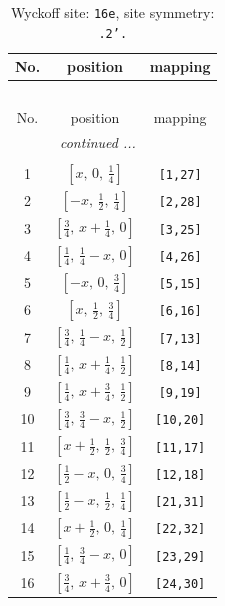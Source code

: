\documentclass[fleqn,8pt]{jsarticle}
\begin{document}
\renewcommand{\arraystretch}{1.2}
\begin{longtable}{ccc}
\caption{Wyckoff site: {\tt 16e}, site symmetry: {\tt .2'.}}
 \\
 \hline \hline
No. & position & mapping \\ \hline \endfirsthead

\multicolumn{2}{l}{\tablename\ \thetable{}} \\
 \hline \hline
No. & position & mapping \\ \hline \endhead

 \hline \hline
\multicolumn{2}{r}{\footnotesize\it continued ...} \\ \endfoot

 \hline \hline
\multicolumn{2}{r}{} \\ \endlastfoot

1 & $\left[ x,\, 0,\, \frac{1}{4} \right]$ & {\tt [1,27]} \\ \hline
2 & $\left[ - x,\, \frac{1}{2},\, \frac{1}{4} \right]$ & {\tt [2,28]} \\ \hline
3 & $\left[ \frac{3}{4},\, x + \frac{1}{4},\, 0 \right]$ & {\tt [3,25]} \\ \hline
4 & $\left[ \frac{1}{4},\, \frac{1}{4} - x,\, 0 \right]$ & {\tt [4,26]} \\ \hline
5 & $\left[ - x,\, 0,\, \frac{3}{4} \right]$ & {\tt [5,15]} \\ \hline
6 & $\left[ x,\, \frac{1}{2},\, \frac{3}{4} \right]$ & {\tt [6,16]} \\ \hline
7 & $\left[ \frac{3}{4},\, \frac{1}{4} - x,\, \frac{1}{2} \right]$ & {\tt [7,13]} \\ \hline
8 & $\left[ \frac{1}{4},\, x + \frac{1}{4},\, \frac{1}{2} \right]$ & {\tt [8,14]} \\ \hline
9 & $\left[ \frac{1}{4},\, x + \frac{3}{4},\, \frac{1}{2} \right]$ & {\tt [9,19]} \\ \hline
10 & $\left[ \frac{3}{4},\, \frac{3}{4} - x,\, \frac{1}{2} \right]$ & {\tt [10,20]} \\ \hline
11 & $\left[ x + \frac{1}{2},\, \frac{1}{2},\, \frac{3}{4} \right]$ & {\tt [11,17]} \\ \hline
12 & $\left[ \frac{1}{2} - x,\, 0,\, \frac{3}{4} \right]$ & {\tt [12,18]} \\ \hline
13 & $\left[ \frac{1}{2} - x,\, \frac{1}{2},\, \frac{1}{4} \right]$ & {\tt [21,31]} \\ \hline
14 & $\left[ x + \frac{1}{2},\, 0,\, \frac{1}{4} \right]$ & {\tt [22,32]} \\ \hline
15 & $\left[ \frac{1}{4},\, \frac{3}{4} - x,\, 0 \right]$ & {\tt [23,29]} \\ \hline
16 & $\left[ \frac{3}{4},\, x + \frac{3}{4},\, 0 \right]$ & {\tt [24,30]} \\
\end{longtable}
\end{document}
